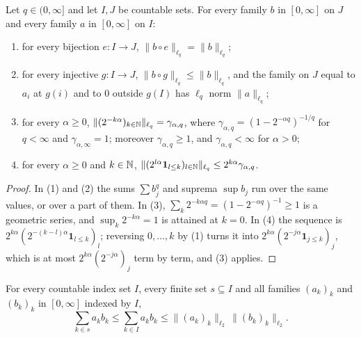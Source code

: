 \begin{lemma}
\label{lem:lq-reindex}
\leanok
{}
Let $q \in (0, \infty]$ and let $I, J$ be countable sets. For every family $b$ in $[0, \infty]$
on $J$ and every family $a$ in $[0, \infty]$ on $I$:
\begin{enumerate}
  \item for every bijection $e : I \to J$, $\|b \circ e\|_{\ell_q} = \|b\|_{\ell_q}$;
  \item for every injective $g : I \to J$, $\|b \circ g\|_{\ell_q} \leq \|b\|_{\ell_q}$, and the
    family on $J$ equal to $a_i$ at $g(i)$ and to $0$ outside $g(I)$ has $\ell_q$ norm
    $\|a\|_{\ell_q}$;
  \item for every $\alpha \geq 0$,
    $\|(2^{-k\alpha})_{k \in \mathbb{N}}\|_{\ell_q} = \gamma_{\alpha, q}$, where
    $\gamma_{\alpha, q} = (1 - 2^{-\alpha q})^{-1/q}$ for $q < \infty$ and
    $\gamma_{\alpha, \infty} = 1$; moreover $\gamma_{\alpha, q} \geq 1$, and
    $\gamma_{\alpha, q} < \infty$ for $\alpha > 0$;
  \item for every $\alpha \geq 0$ and $k \in \mathbb{N}$,
    $\|(2^{l\alpha} \mathbf{1}_{l \leq k})_{l \in \mathbb{N}}\|_{\ell_q}
    \leq 2^{k\alpha} \gamma_{\alpha, q}$.
\end{enumerate}
\end{lemma}

\begin{proof}
\leanok
In (1) and (2) the sums $\sum b_j^q$ and suprema $\sup b_j$ run over the same values, or over a
part of them. In (3), $\sum_k 2^{-k\alpha q} = (1 - 2^{-\alpha q})^{-1} \geq 1$ is a geometric
series, and $\sup_k 2^{-k\alpha} = 1$ is attained at $k = 0$. In (4) the sequence is
$2^{k\alpha} (2^{-(k-l)\alpha} \mathbf{1}_{l \leq k})_l$; reversing $0, \dots, k$ by (1) turns it
into $2^{k\alpha} (2^{-j\alpha} \mathbf{1}_{j \leq k})_j$, which is at most
$2^{k\alpha} (2^{-j\alpha})_j$ term by term, and (3) applies.
\end{proof}

\begin{lemma}
\label{lem:lq-cauchy-schwarz-sequences}
\leanok
{}
For every countable index set $I$, every finite set $s \subseteq I$ and all families
$(a_k)_k$ and $(b_k)_k$ in $[0, \infty]$ indexed by $I$,
\[
  \sum_{k \in s} a_k b_k \leq \sum_{k \in I} a_k b_k
  \leq \|(a_k)_k\|_{\ell_2} \, \|(b_k)_k\|_{\ell_2} .
\]
\end{lemma}

